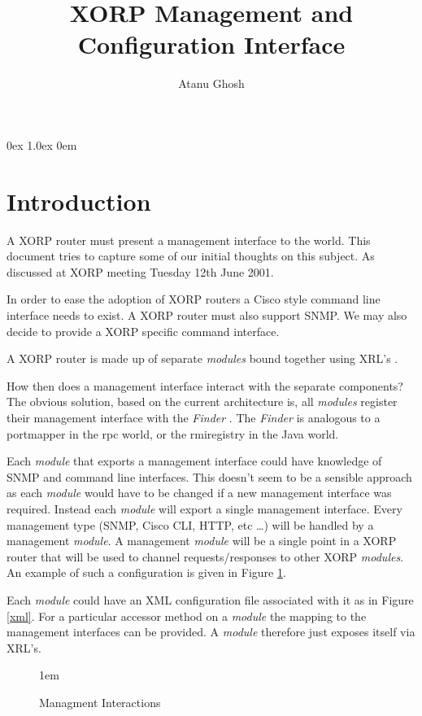 \documentclass[11pt]{article}
\title{XORP Management and Configuration Interface}
\author{Atanu Ghosh}
\makeatletter
\newcommand{\module} {{\em module}\@\xspace}
\newcommand{\modules} {{\em modules}\@\xspace}
\newcommand{\finder} {{\em Finder}\@\xspace}
\makeatother
\begin{document}
\parsep 0ex
\parskip 1.0ex
\parindent 0em
\noindent
\maketitle                            
\section{Introduction}

A XORP router must present a management interface to the world.  This
document tries to capture some of our initial thoughts on this
subject. As discussed at XORP meeting Tuesday 12th June 2001.

In order to ease the adoption of XORP routers a Cisco style command
line interface needs to exist. A XORP router must also support SNMP.
We may also decide to provide a XORP specific command interface.

A XORP router \cite{architecture} is made up of separate \modules
bound together using XRL's \cite{xrl}.

How then does a management interface interact with the separate
components? The obvious solution, based on the current architecture is,
all \modules register their management interface with the \finder
\cite{xrl}. The \finder is analogous to a portmapper in the rpc world,
or the rmiregistry in the Java world.

Each \module that exports a management interface could have knowledge
of SNMP and command line interfaces. This doesn't seem to be a
sensible approach as each \module would have to be changed if a new
management interface was required. Instead each \module will export a
single management interface. Every management type (SNMP, Cisco CLI, HTTP,
etc \ldots) will be handled by a management \module.  A management
\module will be a single point in a XORP router that will be used to
channel requests/responses to other XORP \modules. An example of such
a configuration is given in Figure \ref{modules}.

Each \module could have an XML configuration file associated with it
as in Figure \ref{xml}. For a particular accessor method on a \module
the mapping to the management interfaces can be provided. A \module
therefore just exposes itself via XRL's.

\begin{figure}

\centerline{\raise 1em\box\graph}
\caption{Managment Interactions}
\label{modules}
\end{figure}
\end{document}
